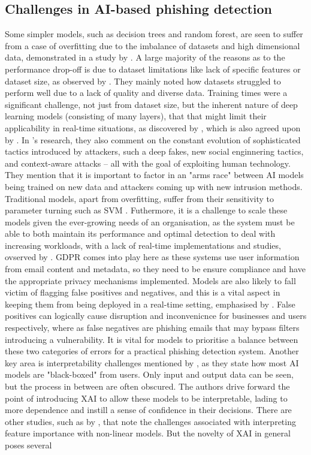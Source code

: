 \subsection*{Challenges in AI-based phishing detection}

Some simpler models, such as decision trees and random forest, are seen to suffer from a case of overfitting due to the imbalance of datasets and high dimensional data, demonstrated in a study by \cite{harikrishnan2018machine}. A large majority of the reasons as to the performance drop-off is due to dataset limitations like lack of specific features or dataset size, as observed by \cite{ahmad2024across}. They mainly noted how datasets struggled to perform well due to a lack of quality and diverse data. Training times were a significant challenge, not just from dataset size, but the inherent nature of deep learning models (consisting of many layers), that that might limit their applicability in real-time situations, as discovered by \cite{kapoor2024comparative}, which is also agreed upon by \cite{atlam2022business}. In \cite{kapoor2024comparative}'s research, they also comment on the constant evolution of sophisticated tactics introduced by attackers, such a deep fakes, new social enginnering tactics, and context-aware attacks -- all with the goal of exploiting human technology. They mention that it is important to factor in an "arms race" between AI models being trained on new data and attackers coming up with new intrusion methods. Traditional models, apart from overfitting, suffer from their sensitivity to parameter turning such as SVM \citep{andriu2023adaptive}. Futhermore, it is a challenge to scale these models given the ever-growing needs of an organisation, as the system must be able to both maintain its performance and optimal detection to deal with increasing workloads, with a lack of real-time implementations and studies, ovserved by \cite{atlam2022business}. GDPR comes into play here as these systems use user information from email content and metadata, so they need to be ensure compliance and have the appropriate privacy mechanisms implemented. Models are also likely to fall victim of flagging false positives and negatives, and this is a vital aspect in keeping them from being deployed in a real-time setting, emphasised by \cite{vishwanath2011people}. False positives can logically cause disruption and inconvenicnce for businesses and users respectively, where as false negatives are phishing emails that may bypass filters introducing a vulnerability. It is vital for models to prioritise a balance between these two categories of errors for a practical phishing detection system. Another key area is interpretability challenges mentioned by \cite{atlam2022business}, as they state how most AI models are "black-boxed" from users. Only input and output data can be seen, but the process in between are often obscured. The authors drive forward the point of introducing XAI to allow these models to be interpretable, lading to more dependence and instill a sense of confidence in their decisions. There are other studies, such as by \cite{al2024novel}, that note the challenges associated with interpreting feature importance with non-linear models. But the novelty of XAI in general poses several 